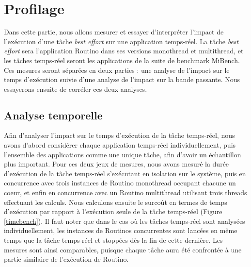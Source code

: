 \section{Profilage}

Dans cette partie, nous allons mesurer et essayer d'interpréter l'impact de 
l'exécution d'une tâche \textit{best effort} sur une application temps-réel.
La tâche \textit{best effort} sera l'application Routino dans ses versions
monothread et multithread, et les tâches temps-réel seront les applications de
la suite de benchmark MiBench\cite{guthaus_mibench:_2001}. Ces mesures seront
séparées en deux parties : une analyse de l'impact sur le temps d'exécution
suivie d'une analyse de l'impact sur la bande passante. Nous essayerons ensuite
de corréler ces deux analyses.

\subsection{Analyse temporelle}
Afin d'analyser l'impact sur le temps d'exécution de la tâche temps-réel, nous
avons d'abord considérer chaque application temps-réel individuellement, puis
l'ensemble des applications comme une unique tâche, afin d'avoir un échantillon
plus important. Pour ces deux jeux de mesures, nous avons mesuré la durée 
d'exécution de la tâche temps-réel s'exécutant en isolation sur le système,
puis en concurrence avec trois instances de Routino monothread occupant
chacune un coeur, et enfin en concurrence avec un Routino multithread utilisant
trois threads effectuant les calculs. Nous calculons ensuite le surcoût en
termes de temps d'exécution par rapport à l'exécution seule de la tâche
temps-réel (Figure \ref{timebench}). Il faut noter que
dans le cas où les tâches temps-réel sont analysées individuellement, les 
instances de Routinos concurrentes sont lancées en même temps que la tâche 
temps-réel et stoppées dès la fin de cette dernière. Les mesures sont ainsi
comparables, puisque chaque tâche aura été confrontée à une partie similaire 
de l'exécution de Routino.

